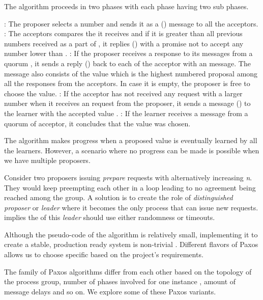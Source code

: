 The algorithm proceeds in two phases with each phase having two sub phases.

\begin{itemize}
  : The proposer selects a number  and sends it as a
   () message to all the acceptors.
  : The acceptors compares the  it
  receives and if it is greater than all previous numbers received as a part of
  , it replies () with a promise not to accept any
  number lower than .
  : If the proposer receives a response to its 
  messages from a quorum%
  , it sends a reply () back to each of the acceptor with an
   message. The message also consists of the value 
  which is the highest numbered proposal among all the responses from the
  acceptors. In case it is empty, the proposer is free to choose the value.
  : If the acceptor has not received any  request
  with a larger number when it receives an  request from the
  proposer, it sends a message () to the learner with the accepted
  value .
  : If the learner receives a message from a quorum of acceptor,
  it concludes that the value  was chosen.
\end{itemize}

The algorithm makes progress when a proposed value is eventually learned by all
the learners. However, a scenario where no progress can be made is possible
when we have multiple proposers.

Consider two proposers issuing \emph{prepare}
requests with alternatively increasing \emph{n}. They would keep
preempting each other in a loop leading to no agreement being reached among the
group. A solution is to create the role of \emph{distinguished proposer} or
\emph{leader} where it becomes the only process that can issue new requests.
\citet{FisLynPat85} implies the  of this \emph{leader}
should use either randomness or timeouts.

Although the pseudo-code of the algorithm is relatively small, implementing it
to create a stable, production ready system is non-trivial \citep{ChandraGR07}.
Different flavors of Paxos allows us to choose specific based on the project's
requirements.

The family of Paxos algorithms differ from each other based on the topology
of the process group, number of phases involved for one instance%
, amount of message delays and so on. We explore some of these Paxos variants.

